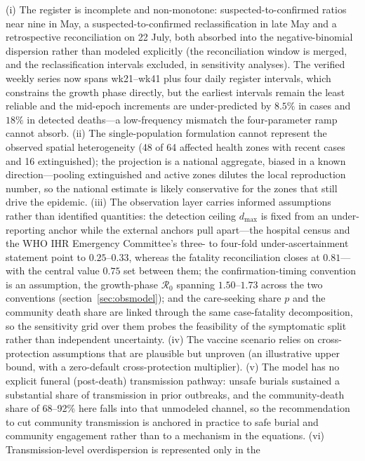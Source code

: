 \documentclass[10pt]{plos}
\newcommand{\Reff}{\mathcal{R}}
\begin{document}
(i) The register is incomplete and non-monotone: suspected-to-confirmed
ratios near nine in May, a suspected-to-confirmed reclassification in
late May and a retrospective reconciliation on 22 July, both absorbed
into the negative-binomial dispersion rather than modeled explicitly
(the reconciliation window is merged, and the reclassification intervals
excluded, in sensitivity analyses). The verified weekly series now spans
wk21--wk41 plus four daily register intervals, which constrains the
growth phase directly, but the earliest intervals remain the least
reliable and the mid-epoch increments are under-predicted by $8.5\%$ in
cases and $18\%$ in detected deaths---a low-frequency mismatch the
four-parameter ramp cannot absorb.
(ii) The single-population formulation cannot represent the observed
spatial heterogeneity (48 of 64 affected health zones with recent cases
and 16 extinguished); the projection is a national
aggregate, biased in a known direction---pooling extinguished and active
zones dilutes the local reproduction number, so the national estimate is
likely conservative for the zones that still drive the epidemic. (iii)
The observation layer carries informed assumptions rather than
identified quantities: the detection ceiling $d_{\max}$ is fixed from an
under-reporting anchor while the external anchors pull apart---the
hospital census and the WHO IHR Emergency Committee's three- to
four-fold under-ascertainment statement  point to
$0.25$--$0.33$, whereas the fatality reconciliation closes at $0.81$---
with the central value $0.75$ set between them; the
confirmation-timing convention is an assumption, the growth-phase
$\Reff_0$ spanning $1.50$--$1.73$ across the two conventions
(section~\ref{sec:obsmodel}); and the
care-seeking share $p$ and the community death share are linked through
the same case-fatality decomposition, so the sensitivity grid over them
probes the feasibility of the symptomatic split rather than independent
uncertainty. (iv) The vaccine scenario relies on cross-protection
assumptions that are plausible but unproven (an illustrative upper
bound, with a zero-default cross-protection multiplier). (v) The model
has no explicit funeral (post-death) transmission pathway: unsafe
burials sustained a substantial share of transmission in prior
outbreaks, and the community-death share of 68--92\% here falls into
that unmodeled channel, so the recommendation to cut community
transmission is anchored in practice to safe burial and community
engagement rather than to a mechanism in the equations. (vi)
Transmission-level overdispersion is represented only in the
\end{document}
